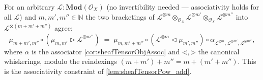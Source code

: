 \begin{lemma}\leanok
  \label{lem:tensorPowAdd_assoc}
  For an arbitrary \(\mathcal{L} : \mathbf{Mod}(\mathcal{O}_X)\) (no invertibility
  needed --- associativity holds for all \(\mathcal{L}\)) and \(m, m', m'' \in \mathbb{N}\)
  the two bracketings of
  \(\mathcal{L}^{\otimes m} \otimes_{\mathcal{O}_X} \mathcal{L}^{\otimes m'}
  \otimes_{\mathcal{O}_X} \mathcal{L}^{\otimes m''}\) into
  \(\mathcal{L}^{\otimes (m+m'+m'')}\) agree:
  \[
    \mu_{m+m', m''} \circ (\mu_{m,m'} \rhd \mathcal{L}^{\otimes m''})
      \;=\;
    \mu_{m, m'+m''} \circ (\mathcal{L}^{\otimes m} \lhd \mu_{m',m''})
      \circ \alpha_{\mathcal{L}^{\otimes m}, \mathcal{L}^{\otimes m'},
        \mathcal{L}^{\otimes m''}},
  \]
  where \(\alpha\) is the associator \cref{cor:sheafTensorObjAssoc} and \(\lhd,
  \rhd\) the canonical whiskerings, modulo the reindexings
  \((m+m')+m'' = m+(m'+m'')\). This is the associativity constraint of
  \cref{lem:sheafTensorPow_add}.
\end{lemma}

